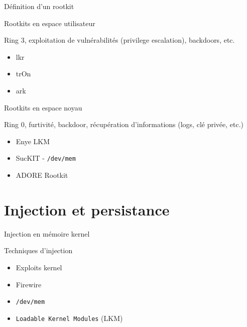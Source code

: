 \documentclass[10pt]{beamer}
\begin{document}
		\begin{frame}{Définition d'un rootkit}

    
		\begin{alertblock}{Rootkits en espace utilisateur}
	    \end{alertblock}
		\vspace{-0.60cm}
		
		Ring 3, exploitation de vulnérabilités (privilege escalation), backdoors, etc.
		\begin{itemize}
			\item lkr
			\item trOn
			\item ark
		\end{itemize}
		
    
		\begin{alertblock}{Rootkits en espace noyau}
	    \end{alertblock}
		\vspace{-0.60cm}
		
		Ring 0, furtivité, backdoor, récupération d'informations (logs, clé privée, etc.)
		\begin{itemize}
			\item Enye LKM
			\item SucKIT - \texttt{/dev/mem}
			\item ADORE Rootkit
		\end{itemize}
	\end{frame}


\section{Injection et persistance}

	\begin{frame}{Injection en mémoire kernel}
		\begin{alertblock}{Techniques d'injection}
	    \end{alertblock}
		\vspace{-0.60cm}
		\begin{itemize}
			\item Exploits kernel
			\item Firewire
			\item\texttt{/dev/mem}
			\item \texttt{Loadable Kernel Modules} (LKM)
		\end{itemize}
	\end{frame}
\end{document}

